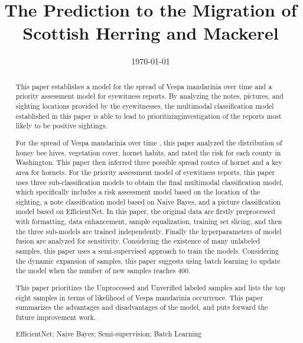 \documentclass{mcmthesis}
\title{\large The Prediction to the Migration of Scottish Herring and Mackerel }
\author{}
\date{\today}
\numberwithin{figure}{section}
\numberwithin{table}{section}
\begin{document}
\begin{abstract}
  This paper establishes a model for the spread of Vespa mandarinia over time and a priority assessment model for eyewitness reports. By analyzing the notes, pictures, and sighting locations provided by the eyewitnesses, the multimodal classification model established in this paper is able to lead to prioritizinginvestigation of the reports most likely to be positive sightings.
  
  For the spread of Vespa mandarinia over time , this paper analyzed the distribution of honey bee hives, vegetation cover, hornet habits, and rated the risk for each county in Washington. This paper then inferred three possible spread routes of hornet and a key area for hornets. For the priority assessment model of eyewitness reports, this paper uses three sub-classification models to obtain the final multimodal classification model, which specifically includes a risk assessment model based on the location of the sighting, a note classification model based on Naive Bayes, and a picture classification model based on EfficientNet. In this paper, the original data are firstly preprocessed with formatting, data enhancement, sample equalization,  training set slicing, and then the three sub-models are trained independently. Finally the hyperparameters of model fusion are analyzed for sensitivity. Considering the existence of many unlabeled samples, this paper uses a semi-supervised approach to train the models. Considering the dynamic expansion of samples, this paper suggests using batch learning to update the model when the number of new samples reaches 400.
  
  This paper prioritizes the Unprocessed and Unverified labeled samples and lists the top eight samples in terms of likelihood of Vespa mandarinia occurrence. This paper summarizes the advantages and disadvantages of the model, and puts forward the future improvement work.
  
\begin{keywords}
EfficientNet; Naive Bayes; Semi-supervision; Batch Learning  

\end{keywords}
\end{abstract}
\maketitle
\pagestyle{empty}
\newpage                                                          %
\begin{adjustwidth}{-1cm}{0cm}

\setcounter{tocdepth}{3}
\thispagestyle{empty}
\tableofcontents                                                  %

\end{adjustwidth}
\end{document}
